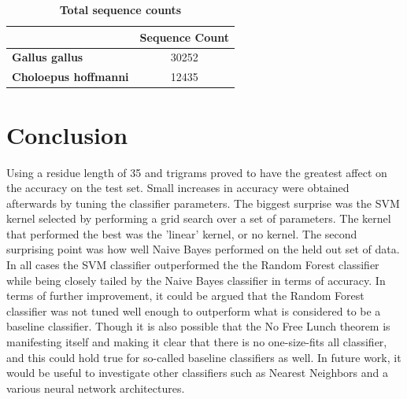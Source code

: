 \documentclass[10pt,letterpaper]{article}
\begin{document}
	\begin{table}[!ht]
		\centering
		\caption{{\bf Total sequence counts }}
		\label{tab:prot-count}
		\begin{tabular}{@{}lc@{}}
			\toprule
			& \multicolumn{1}{l}{Sequence Count} \\ \midrule
			\textbf{Gallus gallus}       & 30252                              \\
			\textbf{Choloepus hoffmanni} & 12435                             
		\end{tabular}
	\end{table}
	
	\section*{Conclusion}
	
	Using a residue length of 35 and trigrams proved to have the greatest affect on the accuracy on the test set. Small increases in accuracy were obtained afterwards by tuning the classifier parameters. The biggest surprise was the SVM kernel selected by performing a grid search over a set of parameters. The kernel that performed the best was the 'linear' kernel, or no kernel. The second surprising point was how well Naive Bayes performed on the held out set of data. In all cases the SVM classifier outperformed the the Random Forest classifier while being closely tailed by the Naive Bayes classifier in terms of accuracy. In terms of further improvement, it could be argued that the Random Forest classifier was not tuned well enough to outperform what is considered to be a baseline classifier.  Though it is also possible that the No Free Lunch theorem is manifesting itself and making it clear that there is no one-size-fits all classifier, and this could hold true for so-called baseline classifiers as well. In future work, it would be useful to investigate other classifiers  such as Nearest Neighbors and a various neural network architectures. 
	
	

	\nolinenumbers
	
\end{document}
